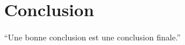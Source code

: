 \documentclass[a4paper,11pt]{article} %
\begin{document}
\section{Conclusion} %
\enquote{Une bonne conclusion est une conclusion finale.} \citep{Hoo12} %

\end{document}
